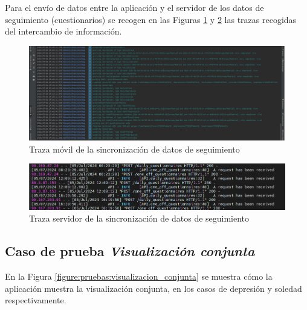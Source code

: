             Para el envío de datos entre la aplicación y el servidor de los datos de seguimiento (cuestionarios) se recogen en las Figuras \ref{figure:pruebas:sincronizacion_cuestionarios:movil} y \ref{figure:pruebas:sincronizacion_cuestionarios:servidor} las trazas recogidas del intercambio de información.

            \begin{figure}[h]
                \centering
                \includegraphics[width=1\textwidth]{figures/pruebas/sincro_cuestionarios/Trazas movil.png}
                \caption{Traza móvil de la sincronización de datos de seguimiento}
                \label{figure:pruebas:sincronizacion_cuestionarios:movil}
            \end{figure}

            \begin{figure}[h]
                \centering
                \includegraphics[width=1\textwidth]{figures/pruebas/sincro_cuestionarios/Trazas servidor.png}
                \caption{Traza servidor  de la sincronización de datos de seguimiento}
                \label{figure:pruebas:sincronizacion_cuestionarios:servidor}
            \end{figure}

            \clearpage  %
            
        \subsection*{Caso de prueba \textit{Visualización conjunta}}

            En la Figura \ref{figure:pruebas:visualizacion_conjunta} se muestra cómo la aplicación muestra la visualización conjunta, en los casos de depresión y soledad respectivamente.

